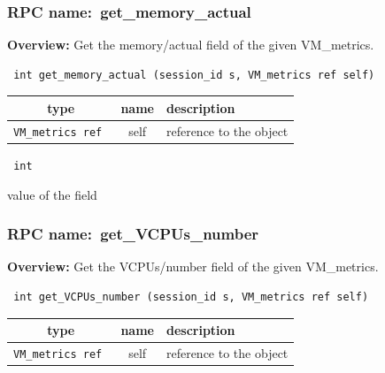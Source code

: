 \subsubsection{RPC name:~get\_memory\_actual}

{\bf Overview:} 
Get the memory/actual field of the given VM\_metrics.

\begin{verbatim} int get_memory_actual (session_id s, VM_metrics ref self)\end{verbatim}



 
\vspace{0.3cm}
\begin{tabular}{|c|c|p{7cm}|}
 \hline
{\bf type} & {\bf name} & {\bf description} \\ \hline
{\tt VM\_metrics ref } & self & reference to the object \\ \hline 

\end{tabular}

\vspace{0.3cm}

{\tt 
int
}


value of the field
\vspace{0.3cm}
\vspace{0.3cm}
\vspace{0.3cm}
\subsubsection{RPC name:~get\_VCPUs\_number}

{\bf Overview:} 
Get the VCPUs/number field of the given VM\_metrics.

\begin{verbatim} int get_VCPUs_number (session_id s, VM_metrics ref self)\end{verbatim}



 
\vspace{0.3cm}
\begin{tabular}{|c|c|p{7cm}|}
 \hline
{\bf type} & {\bf name} & {\bf description} \\ \hline
{\tt VM\_metrics ref } & self & reference to the object \\ \hline 

\end{tabular}

